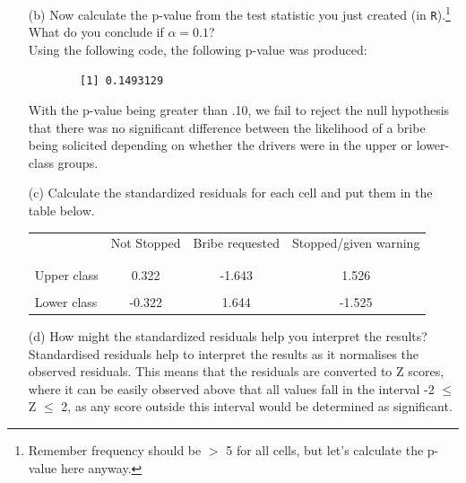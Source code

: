 \documentclass[12pt,letterpaper]{article}
\begin{document}
\begin{enumerate}
	\item [(b)]
	Now calculate the p-value from the test statistic you just created (in \texttt{R}).\footnote{Remember frequency should be $>$ 5 for all cells, but let's calculate the p-value here anyway.}  What do you conclude if $\alpha = 0.1$?\\
	\noindent Using the following code, the following p-value was produced:
	
	\begin{verbatim}
		[1] 0.1493129
	\end{verbatim}
	\noindent With the p-value being greater than .10, we fail to reject the null hypothesis that there was no significant difference between the likelihood of a bribe being solicited depending on whether the drivers were in the upper or lower-class groups.
	\newpage
	\item [(c)] Calculate the standardized residuals for each cell and put them in the table below.
	\vspace{1cm}
	
	\begin{table}[h]
		\centering
		\begin{tabular}{l | c c c }
			& Not Stopped & Bribe requested & Stopped/given warning \\
			\\[-1.8ex] 
			\hline \\[-1.8ex]
			Upper class & 0.322 & -1.643 & 1.526 \\
			\\
			Lower class & -0.322 & 1.644  & -1.525  \\
			
		\end{tabular}
	\end{table}
	
	
	\vspace{7cm}
	\item [(d)] How might the standardized residuals help you interpret the results?  \\
	\noindent Standardised residuals help to interpret the results as it normalises the observed residuals. This means that the residuals are converted to Z scores, where it can be easily observed above that all values fall in the interval -2 $\le$ Z $\le$ 2, as any score outside this interval would be determined as significant.
	
\end{enumerate}
\newpage
\end{document}
